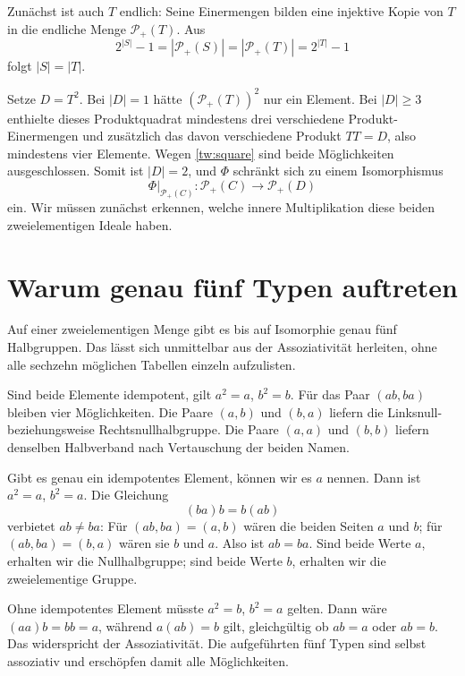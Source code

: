 \documentclass[a4paper,11pt]{article}
\newcommand{\Pp}[1]{\mathcal P_+(#1)}
\begin{document}
Zunächst ist auch \(T\) endlich: Seine Einermengen bilden eine
injektive Kopie von \(T\) in die endliche Menge \(\Pp T\). Aus
\[
 2^{|S|}-1=|\Pp S|=|\Pp T|=2^{|T|}-1
\]
folgt \(|S|=|T|\).

Setze \(D=T^2\). Bei \(|D|=1\) hätte \((\Pp T)^2\) nur ein
Element. Bei \(|D|\ge3\) enthielte dieses Produktquadrat mindestens
drei verschiedene Produkt-Einermengen und zusätzlich das davon
verschiedene Produkt \(TT=D\), also mindestens vier Elemente. Wegen
\eqref{tw:square} sind beide Möglichkeiten ausgeschlossen. Somit ist
\(|D|=2\), und \(\Phi\) schränkt sich zu einem Isomorphismus
\begin{equation}\label{tw:restricted}
 \Phi|_{\Pp C}:\Pp C\longrightarrow\Pp D
\end{equation}
ein. Wir müssen zunächst erkennen, welche innere Multiplikation diese
beiden zweielementigen Ideale haben.

\section{Warum genau fünf Typen auftreten}

Auf einer zweielementigen Menge gibt es bis auf Isomorphie genau fünf
Halbgruppen. Das lässt sich unmittelbar aus der Assoziativität
herleiten, ohne alle sechzehn möglichen Tabellen einzeln aufzulisten.

Sind beide Elemente idempotent, gilt \(a^2=a\), \(b^2=b\). Für das
Paar \((ab,ba)\) bleiben vier Möglichkeiten. Die Paare \((a,b)\)
und \((b,a)\) liefern die Linksnull- beziehungsweise
Rechtsnullhalbgruppe. Die Paare \((a,a)\) und \((b,b)\) liefern
denselben Halbverband nach Vertauschung der beiden Namen.

Gibt es genau ein idempotentes Element, können wir es \(a\) nennen.
Dann ist \(a^2=a\), \(b^2=a\). Die Gleichung
\[
 (ba)b=b(ab)
\]
verbietet \(ab\ne ba\): Für \((ab,ba)=(a,b)\) wären die beiden
Seiten \(a\) und \(b\); für \((ab,ba)=(b,a)\) wären sie \(b\)
und \(a\). Also ist \(ab=ba\). Sind beide Werte \(a\), erhalten
wir die Nullhalbgruppe; sind beide Werte \(b\), erhalten wir die
zweielementige Gruppe.

Ohne idempotentes Element müsste \(a^2=b\), \(b^2=a\) gelten.
Dann wäre \((aa)b=bb=a\), während \(a(ab)=b\) gilt, gleichgültig
ob \(ab=a\) oder \(ab=b\). Das widerspricht der Assoziativität.
Die aufgeführten fünf Typen sind selbst assoziativ und erschöpfen
damit alle Möglichkeiten.
\end{document}
